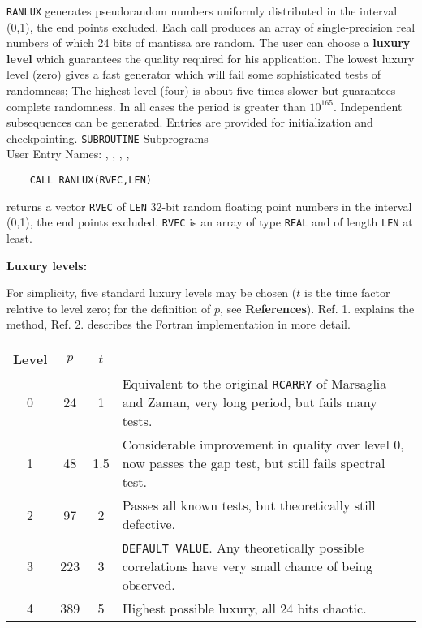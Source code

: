                          
             
\Submitter{}          
{\tt RANLUX} generates pseudorandom numbers uniformly distributed
in the interval (0,1), the end points excluded.
Each call produces an array of single-precision real numbers
of which 24 bits of mantissa are random.
The user can choose a {\bf luxury level} which guarantees the quality
required for his application.  The lowest luxury level (zero) gives
a fast generator which will fail some sophisticated tests of randomness;
The highest level (four) is about five times slower but guarantees
complete randomness. In all cases the period is greater than $10^{165}$.
Independent subsequences can be generated.  Entries are provided for
initialization and checkpointing.
\Structure
{\tt SUBROUTINE} Subprograms\\
User Entry Names: , , ,
, 
\Usage
\begin{verbatim}
    CALL RANLUX(RVEC,LEN)
\end{verbatim}
returns a vector {\tt RVEC} of {\tt LEN} 32-bit random floating
point numbers in the interval (0,1), the end points excluded.
{\tt RVEC} is an array of type {\tt REAL} and
of length {\tt LEN} at least.
\par
{\bf Luxury levels:}
\par
For simplicity, five standard luxury levels may be chosen ($t$ is the
time factor relative to level zero; for the definition of $p$, see
{\bf References}). Ref. 1. explains the method, Ref. 2.
describes the Fortran implementation in more detail.
\begin{center}
\begin{tabular}{|c|c|c|l|}
\cline{1-3}
Level & $p$ & $t$ \\
\hline
0 & 24 & 1 & \parbox[t]{100mm}{
Equivalent to the original {\tt RCARRY} of Marsaglia and Zaman,
very long period, but fails many tests.} \\
1 & 48 & 1.5 & \parbox[t]{100mm}{
Considerable improvement in quality over level 0,
now passes the gap test, but still fails spectral test.} \\
2 & 97 & 2 & \parbox[t]{100mm}{
Passes all known tests, but theoretically still defective.} \\
3 & 223 & 3 & \parbox[t]{100mm}{
{\tt DEFAULT VALUE}. Any theoretically possible
correlations have very small chance of being observed.} \\
4 & 389 & 5 & \parbox[t]{100mm}{
Highest possible luxury, all 24 bits chaotic.} \\
\hline
\end{tabular}
\end{center}
